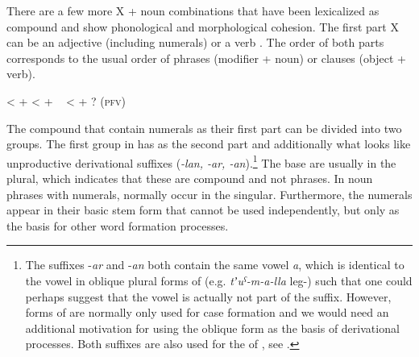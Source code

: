 There are a few more X + noun combinations that have been lexicalized as compound  and show phonological and morphological cohesion. The first part X can be an adjective (including numerals) or a verb . The order of both parts corresponds to the usual order of phrases (modifier + noun) or clauses (object + verb). 


%
\begin{exe}
	\ex	\label{ex:χːulabamother-in-law} 
	\begin{xlist}
		\TabPositions{10em,12em}
		\ex	{}			\tab	<	\tab	 {}  +  
		\ex	{}			\tab	<	\tab	 {}  +  
	\ex	{} 
		\sn	~\hspace*{1em}	\tab < \tab	{}  + ?   (\textsc{pfv})	
	\end{xlist}
\end{exe}	

%

The compound  that contain numerals as their first part can be divided into two groups. The first group in  has  as the second part and additionally what looks like unproductive derivational suffixes (\textit{-lan, -ar, -an}).\footnote{The suffixes -\textit{ar} and -\textit{an} both contain the same vowel \textit{a}, which is identical to the vowel in oblique plural forms of  (e.g. \textit{tʼuˁ-m-a-lla} leg-) such that one could perhaps suggest that the vowel is actually not part of the suffix. However,  forms of  are normally only used for case formation and we would need an additional motivation for using the oblique form as the basis of derivational processes. Both suffixes are also used for the  of , see .} The base  are usually in the plural, which indicates that these are compound  and not phrases. In noun phrases with numerals,  normally occur in the singular. Furthermore, the numerals appear in their basic stem form that cannot be used independently, but only as the basis for other word formation processes. 

